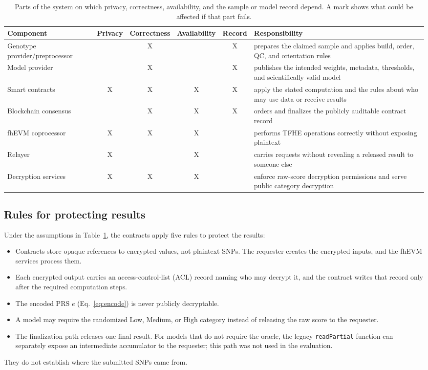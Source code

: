 \documentclass[10pt]{article}
\begin{document}
\begin{table}[t]
\centering
\caption{Parts of the system on which privacy, correctness, availability, and the
sample or model record depend. A mark shows what could be affected if that part fails.}
\label{tab:trust_boundary}
\small
\begin{tabularx}{\textwidth}{@{}XccccX@{}}
\toprule
\textbf{Component} & \textbf{Privacy} & \textbf{Correctness} & \textbf{Availability} & \textbf{Record} & \textbf{Responsibility} \\
\midrule
Genotype provider/preprocessor &  & X &  & X & prepares the claimed sample and applies build, order, QC, and orientation rules \\
Model provider &  & X &  & X & publishes the intended weights, metadata, thresholds, and scientifically valid model \\
Smart contracts & X & X & X & X & apply the stated computation and the rules about who may use data or receive results \\
Blockchain consensus &  & X & X & X & orders and finalizes the publicly auditable contract record \\
fhEVM coprocessor & X & X & X &  & performs TFHE operations correctly without exposing plaintext \\
Relayer & X &  & X &  & carries requests without revealing a released result to someone else \\
Decryption services & X & X & X &  & enforce raw-score decryption permissions and serve public category decryption \\
\bottomrule
\end{tabularx}
\end{table}

\subsection{Rules for protecting results}

Under the assumptions in Table~\ref{tab:trust_boundary}, the contracts apply five
rules to protect the results:
\begin{itemize}
  \item Contracts store opaque references to encrypted values, not plaintext SNPs.
        The requester creates the encrypted inputs, and the fhEVM services process them.
  \item Each encrypted output carries an access-control-list (ACL) record naming who
        may decrypt it, and the contract writes that record only after the required
        computation steps.
  \item The encoded PRS $e$ (Eq.~\ref{eq:encode}) is never publicly decryptable.
  \item A model may require the randomized Low, Medium, or High category instead of
        releasing the raw score to the requester.
  \item The finalization path releases one final result.  For models that do not require
        the oracle, the legacy \texttt{readPartial} function can separately expose an
        intermediate accumulator to the requester; this path was not used in the evaluation.
\end{itemize}
They do not establish where the submitted SNPs came from.
\end{document}

